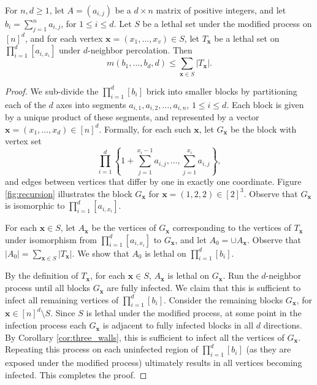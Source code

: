 \begin{lem}
\label{lem:recursion}
For $n,d \geq 1$, let $A = (a_{i,j})$ be a $d \times n$ matrix of positive integers, and let $b_i = \sum_{j=1}^n a_{i,j}$, for $1 \leq i \leq d$. Let $S$ be a lethal set under the modified process on $[n]^d$, and for each vertex $\mathbf{x} = (x_1, \dots, x_v) \in S$, let $T_{\mathbf{x}}$ be a lethal set on $\prod_{i=1}^d [a_{i,x_i}]$ under $d$-neighbor percolation. Then
$$m(b_1, \dots, b_d, d) \leq \sum_{\mathbf{x} \in S} |T_{\mathbf{x}}|.$$
\end{lem}

\begin{proof}
We sub-divide the $\prod_{i=1}^d [b_{i}]$ brick into smaller blocks by partitioning each of the $d$ axes into segments $a_{i,1}, a_{i,2}, \dots, a_{i,n}$, $1 \leq i \leq d$. Each block is given by a unique product of these segments, and represented by a vector $\mathbf{x} = (x_1, \dots, x_d) \in [n]^d$. Formally, for each such $\mathbf{x}$, let $G_{\mathbf{x}}$ be the block with vertex set
$$\prod_{i=1}^d \left\{1+ \sum_{j=1}^{x_i -1}a_{i,j}, \dots, \sum_{j=1}^{x_i}a_{i,j} \right\},$$
and edges between vertices that differ by one in exactly one coordinate. Figure \ref{fig:recursion} illustrates the block $G_{\mathbf{x}}$ for $\mathbf{x} = (1,2,2) \in [2]^3$. Observe that $G_{\mathbf{x}}$ is isomorphic to $\prod_{i=1}^d [a_{i,x_i}]$.

For each $\mathbf{x} \in S$, let $A_{\mathbf{x}}$ be the vertices of $G_{\mathbf{x}}$ corresponding to the vertices of $T_{\mathbf{x}}$ under isomorphism from $\prod_{i=1}^d [a_{i,x_i}]$ to $G_{\mathbf{x}}$, and let $A_0 = \cup A_{\mathbf{x}}$. Observe that $|A_0| = \sum_{\mathbf{x} \in S} |T_{\mathbf{x}}|$. We show that $A_0$ is lethal on $\prod_{i=1}^d [b_{i}]$.

By the definition of $T_{\mathbf{x}}$, for each $\mathbf{x} \in S$, $A_{\mathbf{x}}$ is lethal on $G_{\mathbf{x}}$. Run the $d$-neighbor process until all blocks $G_{\mathbf{x}}$ are fully infected. We claim that this is sufficient to infect all remaining vertices of $\prod_{i=1}^d [b_{i}]$. Consider the remaining blocks $G_{\mathbf{x}}$, for $\mathbf{x} \in [n]^d \setminus S$. Since $S$ is lethal under the modified process, at some point in the infection process each $G_{\mathbf{x}}$ is adjacent to fully infected blocks in all $d$ directions. 
By Corollary \ref{cor:three_walls}, this is sufficient to infect all the vertices of $G_{\mathbf{x}}$. Repeating this process on each uninfected region of $\prod_{i=1}^d [b_{i}]$ (as they are exposed under the modified process) ultimately results in all vertices becoming infected. This completes the proof. 
\end{proof}

